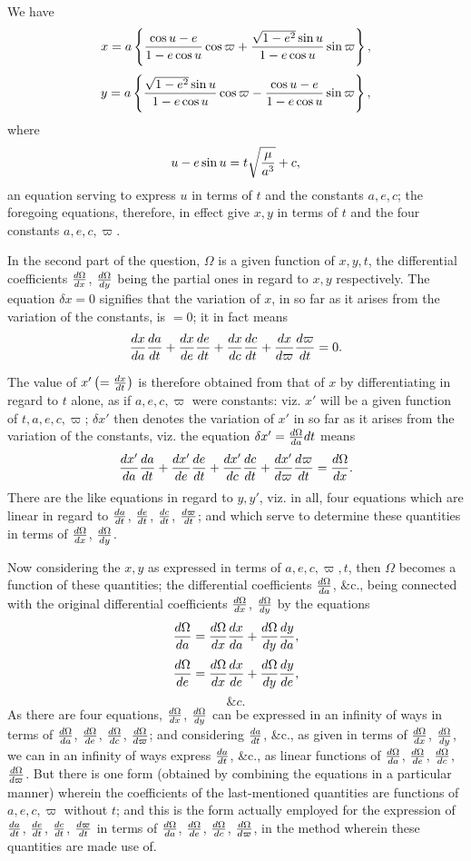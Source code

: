\documentclass[11pt,a4paper]{article}
\theoremstyle{plain}
\theoremstyle{definition}
\begin{document}
We have
\[
x=a\left\{{\cos u-e\over1-e\cos u}\cos\varpi
+{\sqrt{1-e^2}\sin u\over1-e\cos u}\sin\varpi\right\},
\]
\[
y=a\left\{{\sqrt{1-e^2}\sin u\over1-e\cos u}\cos\varpi
-{\cos u-e\over1-e\cos u}\sin\varpi\right\},
\]
where
\[
u-e\sin u=t\sqrt{\mu\over a^3}+c,
\]
an equation serving to express $u$ in terms of $t$ and the constants $a,e,c$; the foregoing equations, therefore, in effect give $x,y$ in terms of $t$ and the four constants $a,e,c,\varpi$.

In the second part of the question, $\Omega$ is a given function of $x,y,t$, the differential coefficients ${d\Omega\over dx}$, ${d\Omega\over dy}$ being the partial ones in regard to $x,y$ respectively. The equation $\delta x=0$ signifies that the variation of $x$, in so far as it arises from the variation of the constants, is $=0$; it in fact means
\[
{dx\over da}{da\over dt}+{dx\over de}{de\over dt}+{dx\over dc}{dc\over dt}
+{dx\over d\varpi}{d\varpi\over dt}=0.
\]

\newpage

The value of $x'\left(={dx\over dt}\right)$ is therefore obtained from that of $x$ by differentiating in regard to $t$ alone, as if $a,e,c,\varpi$ were constants: viz. $x'$ will be a given function of $t,a,e,c,\varpi$; $\delta x'$ then denotes the variation of $x'$ in so far as it arises from the variation of the constants, viz. the equation $\delta x'={d\Omega\over da}dt$ means
\[
{dx'\over da}{da\over dt}+{dx'\over de}{de\over dt}
+{dx'\over dc}{dc\over dt}+{dx'\over d\varpi}{d\varpi\over dt}
={d\Omega\over dx}.
\]
There are the like equations in regard to $y,y'$, viz. in all, four equations which are linear in regard to ${da\over dt}$, ${de\over dt}$, ${dc\over dt}$, ${d\varpi\over dt}$; and which serve to determine these quantities in terms of ${d\Omega\over dx}$, ${d\Omega\over dy}$.

Now considering the $x,y$ as expressed in terms of $a,e,c,\varpi,t$, then $\Omega$ becomes a function of these quantities; the differential coefficients ${d\Omega\over da}$, \&c., being connected with the original differential coefficients ${d\Omega\over dx}$, ${d\Omega\over dy}$ by the equations
\[
{d\Omega\over da}={d\Omega\over dx}{dx\over da}+{d\Omega\over dy}{dy\over da},
\]
\[
{d\Omega\over de}={d\Omega\over dx}{dx\over de}+{d\Omega\over dy}{dy\over de},
\]
\[
\&c.
\]
As there are four equations, ${d\Omega\over dx}$, ${d\Omega\over dy}$ can be expressed in an infinity of ways in terms of ${d\Omega\over da}$, ${d\Omega\over de}$, ${d\Omega\over dc}$, ${d\Omega\over d\varpi}$; and considering ${da\over dt}$, \&c., as given in terms of ${d\Omega\over dx}$, ${d\Omega\over dy}$, we can in an infinity of ways express ${da\over dt}$, \&c., as linear functions of ${d\Omega\over da}$, ${d\Omega\over de}$, ${d\Omega\over dc}$, ${d\Omega\over d\varpi}$. But there is one form (obtained by combining the equations in a particular manner) wherein the coefficients of the last-mentioned quantities are functions of $a,e,c,\varpi$ without $t$; and this is the form actually employed for the expression of ${da\over dt}$, ${de\over dt}$, ${dc\over dt}$, ${d\varpi\over dt}$ in terms of ${d\Omega\over da}$, ${d\Omega\over de}$, ${d\Omega\over dc}$, ${d\Omega\over d\varpi}$, in the method wherein these quantities are made use of.
\end{document}
